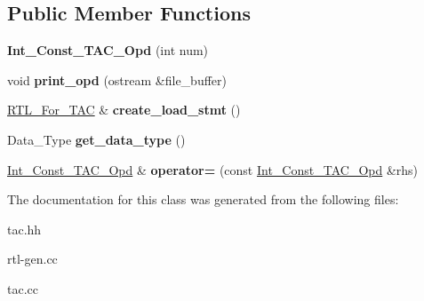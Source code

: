 \subsection*{Public Member Functions}
\begin{DoxyCompactItemize}
\item 
\mbox{\label{classInt__Const__TAC__Opd_ab75c34f9d912c61be577c98be1411745}} 
{\bfseries Int\+\_\+\+Const\+\_\+\+T\+A\+C\+\_\+\+Opd} (int num)
\item 
\mbox{\label{classInt__Const__TAC__Opd_a1ef46bda70c48bf10d422e4b98cecb11}} 
void {\bfseries print\+\_\+opd} (ostream \&file\+\_\+buffer)
\item 
\mbox{\label{classInt__Const__TAC__Opd_a89c4d16a0fe5a7f77c0f3ccdc1d035ae}} 
\hyperlink{classRTL__For__TAC}{R\+T\+L\+\_\+\+For\+\_\+\+T\+AC} \& {\bfseries create\+\_\+load\+\_\+stmt} ()
\item 
\mbox{\label{classInt__Const__TAC__Opd_a9796fb481e155b3fb8cbd2e4fa319598}} 
Data\+\_\+\+Type {\bfseries get\+\_\+data\+\_\+type} ()
\item 
\mbox{\label{classInt__Const__TAC__Opd_ae3ab56dfe84d74a24b92c1bb19032bdf}} 
\hyperlink{classInt__Const__TAC__Opd}{Int\+\_\+\+Const\+\_\+\+T\+A\+C\+\_\+\+Opd} \& {\bfseries operator=} (const \hyperlink{classInt__Const__TAC__Opd}{Int\+\_\+\+Const\+\_\+\+T\+A\+C\+\_\+\+Opd} \&rhs)
\end{DoxyCompactItemize}


The documentation for this class was generated from the following files\+:\begin{DoxyCompactItemize}
\item 
tac.\+hh\item 
rtl-\/gen.\+cc\item 
tac.\+cc\end{DoxyCompactItemize}
